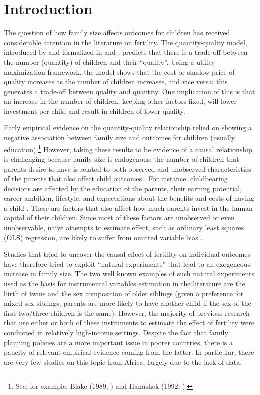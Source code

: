 
\section{Introduction}

The question of how family size affects outcomes for children has received considerable attention in the literature on fertility. The quantity-quality model, introduced by \textcite{Becker1960} and formalized in \textcite{Becker1973} and \textcite{Becker1976}, predicts that there is a trade-off between the number (quantity) of children and their “quality”. Using a utility maximization framework, the model shows that the cost or shadow price of quality increases as the number of children increases, and vice versa; this generates a trade-off between quality and quantity. One implication of this is that an increase in the number of children, keeping other factors fixed, will lower investment per child and result in children of lower quality.

Early empirical evidence on the quantity-quality relationship relied on showing a negative association between family size and outcomes for children (usually education).\footnote{See, for example, Blake (1989, \cite[cited in][]{Black2010}) and Hanushek (1992, \cite[cited in][]{angrist_multiple_2010}).}  However, taking these results to be evidence of a causal relationship is challenging because family size is endogenous; the number of children that parents desire to have is related to both observed and unobserved characteristics of the parents that also affect child outcomes \parencite{Black2010}. For instance, childbearing decisions are affected by the education of the parents, their earning potential, career ambition, lifestyle, and expectations about the benefits and costs of having a child \parencite{Angrist2006,oberg_casual_2021}. These are factors that also affect how much parents invest in the human capital of their children. Since most of these factors are unobserved or even unobservable, naïve attempts to estimate effect, such as ordinary least squares (OLS) regression, are likely to suffer from omitted variable bias \parencite{oberg_casual_2021}.

Studies that tried to uncover the causal effect of fertility on individual outcomes have therefore tried to exploit “natural experiments” that lead to an exogeneous increase in family size. The two well known examples of such natural experiments used as the basis for instrumental variables estimation in the literature are the birth of twins and the sex composition of older siblings (given a preference for mixed-sex siblings, parents are more likely to have another child if the sex of the first two/three children is the same). However, the majority of previous research that use either or both of these instruments to estimate the effect of fertility were conducted in relatively high-income settings. Despite the fact that family planning policies are a more important issue in poorer countries, there is a paucity of relevant empirical evidence coming from the latter. In particular, there are very few studies on this topic from Africa, largely due to the lack of data. 

